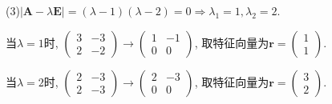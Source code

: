 \begin{solve}
(3)$|\bm{A}-\lambda\bm{E}|=(\lambda-1)(\lambda-2)=0\Rightarrow\lambda_1=1,\lambda_2=2$.

当$\lambda=1$时, $\begin{pmatrix}3&-3\\2&-2\end{pmatrix}\to\begin{pmatrix}1&-1\\0&0\end{pmatrix}$, 
取特征向量为$\bm{r}=\begin{pmatrix}1\\1\end{pmatrix}$.

当$\lambda=2$时, $\begin{pmatrix}2&-3\\2&-3\end{pmatrix}\to\begin{pmatrix}2&-3\\0&0\end{pmatrix}$, 取特征向量为$\bm{r}=\begin{pmatrix}3\\2\end{pmatrix}$.


\end{solve}
